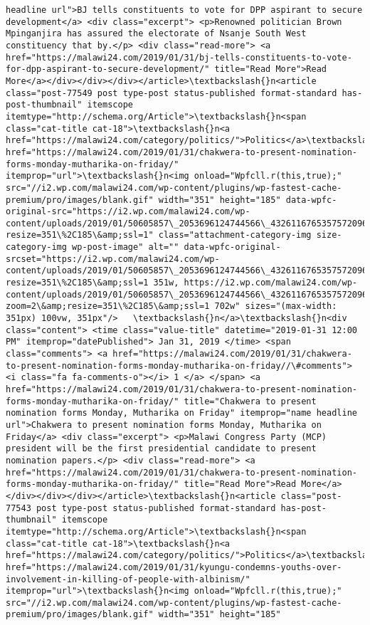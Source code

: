 \documentclass[11pt]{article}
\begin{document}
\begin{Verbatim}[commandchars=\\\{\}]
headline url">BJ tells constituents to vote for DPP aspirant to secure development</a> <div class="excerpt"> <p>Renowned politician Brown Mpinganjira has assured the electorate of Nsanje South West constituency that by.</p> <div class="read-more"> <a href="https://malawi24.com/2019/01/31/bj-tells-constituents-to-vote-for-dpp-aspirant-to-secure-development/" title="Read More">Read More</a></div></div></div></article>\textbackslash{}n<article class="post-77549 post type-post status-published format-standard has-post-thumbnail" itemscope itemtype="http://schema.org/Article">\textbackslash{}n<span class="cat-title cat-18">\textbackslash{}n<a href="https://malawi24.com/category/politics/">Politics</a>\textbackslash{}n</span>\textbackslash{}n<a href="https://malawi24.com/2019/01/31/chakwera-to-present-nomination-forms-monday-mutharika-on-friday/" itemprop="url">\textbackslash{}n<img onload="Wpfcll.r(this,true);" src="//i2.wp.com/malawi24.com/wp-content/plugins/wp-fastest-cache-premium/pro/images/blank.gif" width="351" height="185" data-wpfc-original-src="https://i2.wp.com/malawi24.com/wp-content/uploads/2019/01/50605857\_2053696124744566\_4326116765357572096\_n.jpg?resize=351\%2C185\&amp;ssl=1" class="attachment-category-img size-category-img wp-post-image" alt="" data-wpfc-original-srcset="https://i2.wp.com/malawi24.com/wp-content/uploads/2019/01/50605857\_2053696124744566\_4326116765357572096\_n.jpg?resize=351\%2C185\&amp;ssl=1 351w, https://i2.wp.com/malawi24.com/wp-content/uploads/2019/01/50605857\_2053696124744566\_4326116765357572096\_n.jpg?zoom=2\&amp;resize=351\%2C185\&amp;ssl=1 702w" sizes="(max-width: 351px) 100vw, 351px"/>   \textbackslash{}n</a>\textbackslash{}n<div class="content"> <time class="value-title" datetime="2019-01-31 12:00 PM" itemprop="datePublished"> Jan 31, 2019 </time> <span class="comments"> <a href="https://malawi24.com/2019/01/31/chakwera-to-present-nomination-forms-monday-mutharika-on-friday//\#comments"> <i class="fa fa-comments-o"></i> 1 </a> </span> <a href="https://malawi24.com/2019/01/31/chakwera-to-present-nomination-forms-monday-mutharika-on-friday/" title="Chakwera to present nomination forms Monday, Mutharika on Friday" itemprop="name headline url">Chakwera to present nomination forms Monday, Mutharika on Friday</a> <div class="excerpt"> <p>Malawi Congress Party (MCP) president will be the first presidential candidate to present nomination papers.</p> <div class="read-more"> <a href="https://malawi24.com/2019/01/31/chakwera-to-present-nomination-forms-monday-mutharika-on-friday/" title="Read More">Read More</a></div></div></div></article>\textbackslash{}n<article class="post-77543 post type-post status-published format-standard has-post-thumbnail" itemscope itemtype="http://schema.org/Article">\textbackslash{}n<span class="cat-title cat-18">\textbackslash{}n<a href="https://malawi24.com/category/politics/">Politics</a>\textbackslash{}n</span>\textbackslash{}n<a href="https://malawi24.com/2019/01/31/kyungu-condemns-youths-over-involvement-in-killing-of-people-with-albinism/" itemprop="url">\textbackslash{}n<img onload="Wpfcll.r(this,true);" src="//i2.wp.com/malawi24.com/wp-content/plugins/wp-fastest-cache-premium/pro/images/blank.gif" width="351" height="185" 
\end{Verbatim}
\end{document}
